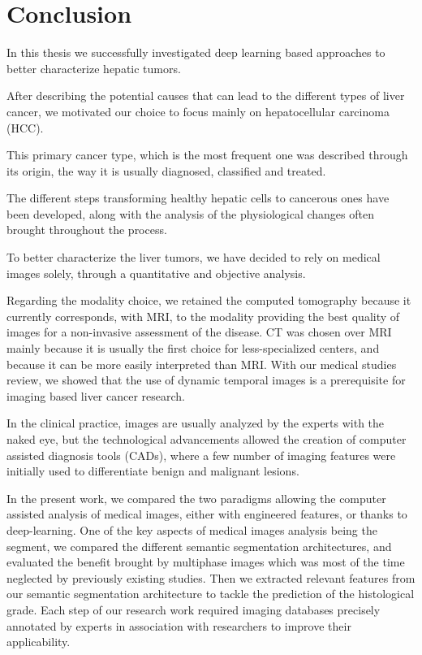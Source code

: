 \chapter{Conclusion}\label{conclusion}

In this thesis we successfully investigated deep learning based
approaches to better characterize hepatic tumors.

After describing the potential causes that can lead to the different
types of liver cancer, we motivated our choice to focus mainly on
hepatocellular carcinoma (HCC).

This primary cancer type, which is the most frequent one was described
through its origin, the way it is usually diagnosed, classified and
treated.

The different steps transforming healthy hepatic cells to cancerous ones
have been developed, along with the analysis of the physiological
changes often brought throughout the process.

To better characterize the liver tumors, we have decided to rely on
medical images solely, through a quantitative and objective analysis.

Regarding the modality choice, we retained the computed tomography
because it currently corresponds, with MRI, to the modality providing
the best quality of images for a non-invasive assessment of the disease.
CT was chosen over MRI mainly because it is usually the first choice for
less-specialized centers, and because it can be more easily interpreted
than MRI. With our medical studies review, we showed that the use of
dynamic temporal images is a prerequisite for imaging based liver cancer
research.

In the clinical practice, images are usually analyzed by the experts
with the naked eye, but the technological advancements allowed the
creation of computer assisted diagnosis tools (CADs), where a few number
of imaging features were initially used to differentiate benign and
malignant lesions.

In the present work, we compared the two paradigms allowing the computer
assisted analysis of medical images, either with engineered features, or
thanks to deep-learning. One of the key aspects of medical images
analysis being the segment, we compared the different semantic
segmentation architectures, and evaluated the benefit brought by
multiphase images which was most of the time neglected by previously
existing studies. Then we extracted relevant features from our semantic
segmentation architecture to tackle the prediction of the histological
grade. Each step of our research work required imaging databases
precisely annotated by experts in association with researchers to
improve their applicability.

